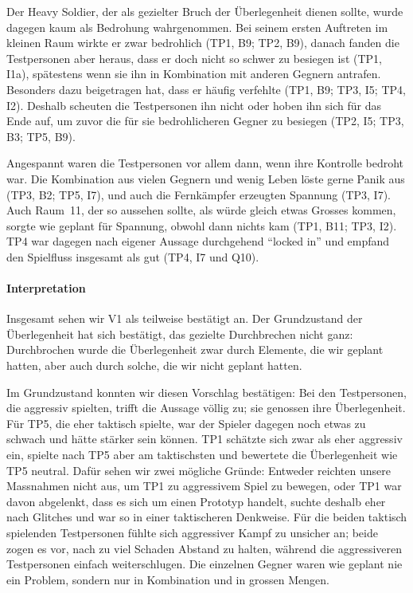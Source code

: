 \documentclass[../Main.tex]{subfiles}
\begin{document}
Der Heavy Soldier, der als gezielter Bruch der Überlegenheit dienen sollte, wurde dagegen kaum als Bedrohung wahrgenommen. Bei seinem ersten Auftreten im kleinen Raum wirkte er zwar bedrohlich (TP1, B9; TP2, B9), danach fanden die Testpersonen aber heraus, dass er doch nicht so schwer zu besiegen ist (TP1, I1a), spätestens wenn sie ihn in Kombination mit anderen Gegnern antrafen. Besonders dazu beigetragen hat, dass er häufig verfehlte (TP1, B9; TP3, I5; TP4, I2). Deshalb scheuten die Testpersonen ihn nicht oder hoben ihn sich für das Ende auf, um zuvor die für sie bedrohlicheren Gegner zu besiegen (TP2, I5; TP3, B3; TP5, B9).

Angespannt waren die Testpersonen vor allem dann, wenn ihre Kontrolle bedroht war. Die Kombination aus vielen Gegnern und wenig Leben löste gerne Panik aus (TP3, B2; TP5, I7), und auch die Fernkämpfer erzeugten Spannung (TP3, I7). Auch Raum~11, der so aussehen sollte, als würde gleich etwas Grosses kommen, sorgte wie geplant für Spannung, obwohl dann nichts kam (TP1, B11; TP3, I2). TP4 war dagegen nach eigener Aussage durchgehend \enquote{locked in} und empfand den Spielfluss insgesamt als gut (TP4, I7 und Q10).

\paragraph{Interpretation}
Insgesamt sehen wir V1 als teilweise bestätigt an. Der Grundzustand der Überlegenheit hat sich bestätigt, das gezielte Durchbrechen nicht ganz: Durchbrochen wurde die Überlegenheit zwar durch Elemente, die wir geplant hatten, aber auch durch solche, die wir nicht geplant hatten.

Im Grundzustand konnten wir diesen Vorschlag bestätigen: Bei den Testpersonen, die aggressiv spielten, trifft die Aussage völlig zu; sie genossen ihre Überlegenheit. Für TP5, die eher taktisch spielte, war der Spieler dagegen noch etwas zu schwach und hätte stärker sein können. TP1 schätzte sich zwar als eher aggressiv ein, spielte nach TP5 aber am taktischsten und bewertete die Überlegenheit wie TP5 neutral. Dafür sehen wir zwei mögliche Gründe: Entweder reichten unsere Massnahmen nicht aus, um TP1 zu aggressivem Spiel zu bewegen, oder TP1 war davon abgelenkt, dass es sich um einen Prototyp handelt, suchte deshalb eher nach Glitches und war so in einer taktischeren Denkweise. Für die beiden taktisch spielenden Testpersonen fühlte sich aggressiver Kampf zu unsicher an; beide zogen es vor, nach zu viel Schaden Abstand zu halten, während die aggressiveren Testpersonen einfach weiterschlugen. Die einzelnen Gegner waren wie geplant nie ein Problem, sondern nur in Kombination und in grossen Mengen.
\end{document}
